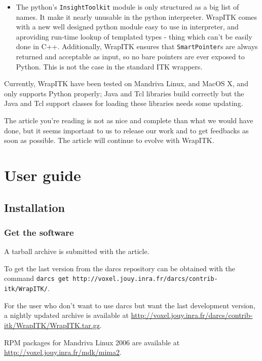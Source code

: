 \documentclass{InsightArticle}
\begin{document}
\begin{itemize}
  \item  The python's \verb$InsightToolkit$ module is only structured as a big
list of names. It make it nearly unusable in the python interpreter. WrapITK
comes with a new well designed python module easy to use in interpreter, and
aproviding run-time lookup of templated types - thing which can't be easily done
in C++. Additionally, WrapITK ensures that \verb$SmartPointer$s are always
returned and acceptable as input, so no bare pointers are ever exposed to
Python. This is not the case in the standard ITK wrappers.

\end{itemize}

Currently, WrapITK have been tested on Mandriva Linux, and MacOS X, and only
supports Python properly; Java and Tcl libraries build
correctly but the Java and Tcl support classes for loading these libraries needs
some updating.

The article you're reading is not as nice and complete than what we would have
done, but it seems important to us to release our work and to get feedbacks
as soon as possible. The article will continue to evolve with WrapITK.


\section{User guide}

  \subsection{Installation}

    \subsubsection{Get the software}

A tarball archive is submitted with the article.

To get the last version from the darcs repository can be obtained
with the command 
\verb$darcs get http://voxel.jouy.inra.fr/darcs/contrib-itk/WrapITK/$.

For the user who don't want to use darcs \cite{DarcsWebSite} but want the last development version,
a nightly updated archive is available at
\url{http://voxel.jouy.inra.fr/darcs/contrib-itk/WrapITK/WrapITK.tar.gz}.

RPM packages for Mandriva Linux 2006 are available at \url{http://voxel.jouy.inra.fr/mdk/mima2}.
\end{document}
